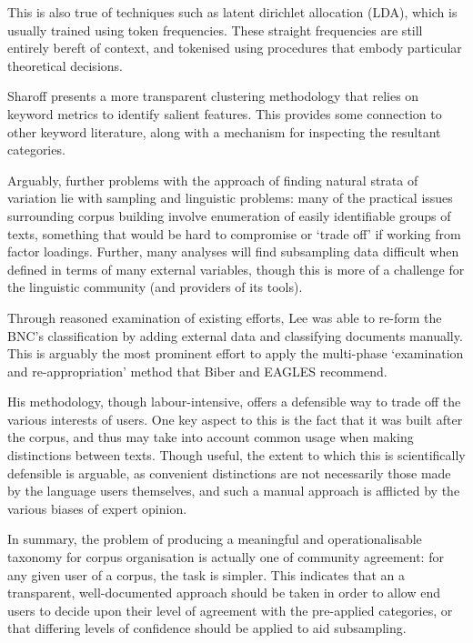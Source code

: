 This is also true of techniques such as latent dirichlet allocation (LDA), which is usually trained using token frequencies.  These straight frequencies are still entirely bereft of context, and tokenised using procedures that embody particular theoretical decisions.

Sharoff\cite{sharoff2007classifying} presents a more transparent clustering methodology that relies on keyword metrics to identify salient features.  This provides some connection to other keyword literature, along with a mechanism for inspecting the resultant categories.

Arguably, further problems with the approach of finding natural strata of variation lie with sampling and linguistic problems: many of the practical issues surrounding corpus building involve enumeration of easily identifiable groups of texts, something that would be hard to compromise or `trade off' if working from factor loadings.  Further, many analyses will find subsampling data difficult when defined in terms of many external variables, though this is more of a challenge for the linguistic community (and providers of its tools).


Through reasoned examination of existing efforts, Lee\cite{lee2003bnc}
was able to re-form the BNC's classification by adding external data and classifying documents manually.  This is arguably the most prominent effort to apply the multi-phase `examination and re-appropriation' method that Biber and EAGLES recommend.

His methodology, though labour-intensive, offers a defensible way to trade off the various interests of users.  One key aspect to this is the fact that it was built after the corpus, and thus may take into account common usage when making distinctions between texts.  Though useful, the extent to which this is scientifically defensible is arguable, as convenient distinctions are not necessarily those made by the language users themselves, and such a manual approach is afflicted by the various biases of expert opinion.



In summary, the problem of producing a meaningful and operationalisable taxonomy for corpus organisation is actually one of community agreement: for any given user of a corpus, the task is simpler.  This indicates that an a transparent, well-documented approach should be taken in order to allow end users to decide upon their level of agreement with the pre-applied categories, or that differing levels of confidence should be applied to aid subsampling.


